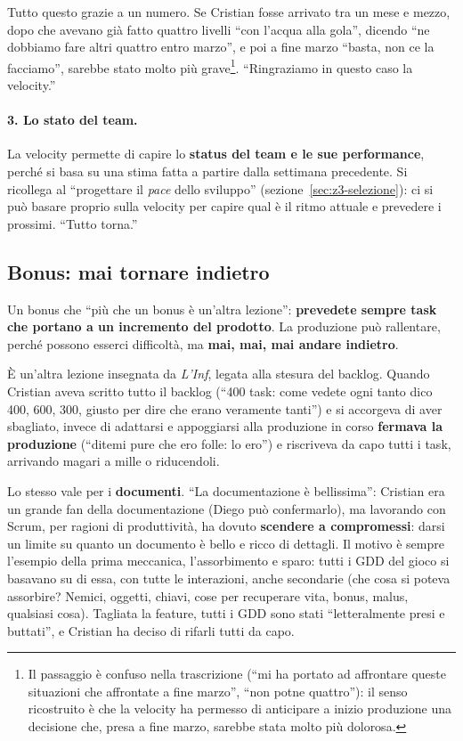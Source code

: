 Tutto questo grazie a un numero. Se Cristian fosse arrivato tra un mese e
mezzo, dopo che avevano già fatto quattro livelli ``con l'acqua alla gola'',
dicendo ``ne dobbiamo fare altri quattro entro marzo'', e poi a fine marzo
``basta, non ce la facciamo'', sarebbe stato molto più grave\footnote{Il
passaggio è confuso nella trascrizione (``mi ha portato ad affrontare queste
situazioni che affrontate a fine marzo'', ``non potne quattro''): il senso
ricostruito è che la velocity ha permesso di anticipare a inizio produzione una
decisione che, presa a fine marzo, sarebbe stata molto più dolorosa.}.
``Ringraziamo in questo caso la velocity.''

\paragraph{3. Lo stato del team.} La velocity permette di capire lo
\textbf{status del team e le sue performance}, perché si basa su una stima fatta
a partire dalla settimana precedente. Si ricollega al ``progettare il \emph{pace}
dello sviluppo'' (sezione~\ref{sec:z3-selezione}): ci si può basare proprio sulla
velocity per capire qual è il ritmo attuale e prevedere i prossimi. ``Tutto
torna.''

\subsection{Bonus: mai tornare indietro}

Un bonus che ``più che un bonus è un'altra lezione'': \textbf{prevedete sempre
task che portano a un incremento del prodotto}. La produzione può rallentare,
perché possono esserci difficoltà, ma \textbf{mai, mai, mai andare indietro}.

È un'altra lezione insegnata da \emph{L'Inf}, legata alla stesura del backlog.
Quando Cristian aveva scritto tutto il backlog (``400 task: come vedete ogni
tanto dico 400, 600, 300, giusto per dire che erano veramente tanti'') e si
accorgeva di aver sbagliato, invece di adattarsi e appoggiarsi alla produzione
in corso \textbf{fermava la produzione} (``ditemi pure che ero folle: lo ero'')
e riscriveva da capo tutti i task, arrivando magari a mille o riducendoli.

Lo stesso vale per i \textbf{documenti}. ``La documentazione è bellissima'':
Cristian era un grande fan della documentazione (Diego può confermarlo), ma
lavorando con Scrum, per ragioni di produttività, ha dovuto \textbf{scendere a
compromessi}: darsi un limite su quanto un documento è bello e ricco di
dettagli. Il motivo è sempre l'esempio della prima meccanica, l'assorbimento e
sparo: tutti i GDD del gioco si basavano su di essa, con tutte le interazioni,
anche secondarie (che cosa si poteva assorbire? Nemici, oggetti, chiavi, cose
per recuperare vita, bonus, malus, qualsiasi cosa). Tagliata la feature, tutti i
GDD sono stati ``letteralmente presi e buttati'', e Cristian ha deciso di
rifarli tutti da capo.

